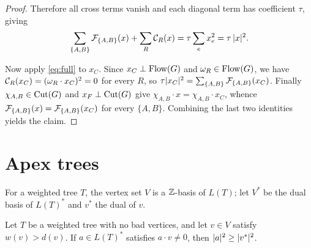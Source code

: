 \begin{proof}
Therefore all cross terms vanish and each diagonal term has coefficient $\tau$, giving
\begin{equation}
\label{eq:full}
\sum_{\{A,B\}}\mathcal{F}_{\{A,B\}}(x)+\sum_{R}\mathcal{C}_R(x)=\tau\sum_e x_e^2=\tau\,\lvert x\rvert^{2}.
\end{equation}

Now apply \eqref{eq:full} to $x_C$.  Since $x_C\perp\operatorname{Flow}(G)$ and $\omega_R\in\operatorname{Flow}(G)$, we
have $\mathcal{C}_R(x_C)=(\omega_R\cdot x_C)^2=0$ for every $R$, so
$\tau\lvert x_C\rvert^{2}=\sum_{\{A,B\}}\mathcal{F}_{\{A,B\}}(x_C)$.  Finally $\chi_{A,B}\in\operatorname{Cut}(G)$ and
$x_F\perp\operatorname{Cut}(G)$ give $\chi_{A,B}\cdot x=\chi_{A,B}\cdot x_C$, whence
$\mathcal{F}_{\{A,B\}}(x)=\mathcal{F}_{\{A,B\}}(x_C)$ for every $\{A,B\}$.  Combining the last two
identities yields the claim.
\end{proof}

\section{Apex trees}
\label{sec:apex}

For a weighted tree $T$, the vertex set $V$ is a $\mathbb{Z}$-basis of $L(T)$; let $V^\ast$ be the
dual basis of $L(T)^\ast$ and $v^\ast$ the dual of $v$.

\begin{lem}
\label{lem:apex}
Let $T$ be a weighted tree with no bad vertices, and let $v\in V$ satisfy $w(v)>d(v)$.  If
$a\in L(T)^\ast$ satisfies $a\cdot v\ne 0$, then $\lvert a\rvert^{2}\ge\lvert v^\ast\rvert^{2}$.
\end{lem}

